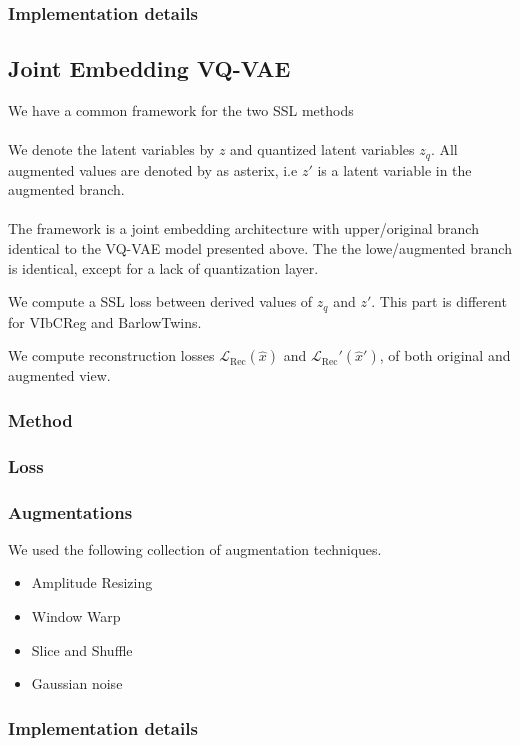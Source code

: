 \documentclass[../../thesis.tex]{subfiles}
\begin{document}
\subsubsection{Implementation details}


\subsection{Joint Embedding VQ-VAE}
We have a common framework for the two SSL methods\\\\
We denote the latent variables by $z$ and quantized latent variables $z_q$. All augmented values are denoted by as asterix, i.e $z'$ is a latent variable in the augmented branch. \\\\


The framework is a joint embedding architecture with upper/original branch identical to the VQ-VAE model presented above. The the lowe/augmented branch is identical, except for a lack of quantization layer. 

We compute a SSL loss between derived values of $z_q$ and $z'$. This part is different for VIbCReg and BarlowTwins.  

We compute reconstruction losses $\mathcal{L}_{\text{Rec}}(\hat{x})$ and $\mathcal{L}_{\text{Rec}}'(\hat{x}')$, of both original and augmented view. 
\subsubsection{Method}

\subsubsection{Loss}


\subsubsection{Augmentations}
We used the following collection of augmentation techniques.
\begin{itemize}
    \item Amplitude Resizing
    \item Window Warp
    \item Slice and Shuffle
    \item Gaussian noise
\end{itemize}

\subsubsection{Implementation details}
\end{document}
